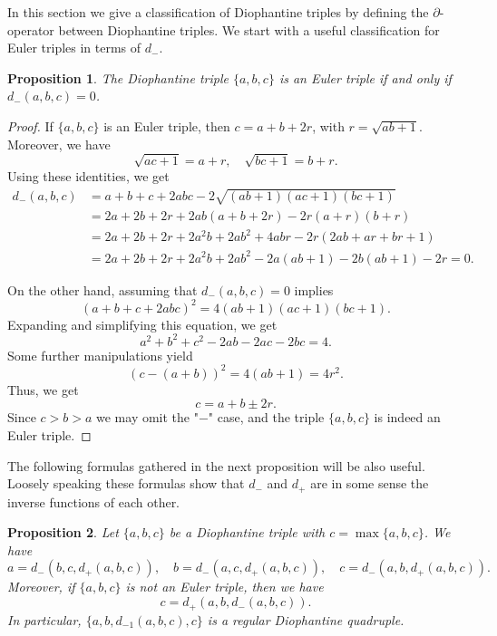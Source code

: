 \documentclass{amsart}
\newtheorem{proposition}{Proposition}
\theoremstyle{definition}
\begin{document}
In this section we give a classification of Diophantine triples by defining the $\partial$-operator between Diophantine triples.
We start with a useful classification for Euler triples in terms of $d_{-}$.

\begin{proposition}\label{pro:2-1}
The Diophantine triple $\{a, b, c\}$ is an Euler triple if and only if $d_{-}(a, b, c) = 0$.
\end{proposition}

\begin{proof}
 If $\{a, b, c\}$ is an Euler triple, then  $c=a+b+2r$, with $r=\sqrt{ab+1}$. Moreover, we have 
$$
\sqrt{ac+1}=a+r ,\quad \sqrt{bc+1}= b+r. 
$$
Using these identities, we get
\begin{align*}
d_{-}(a, b, c) &= a+b+c + 2abc -  2\sqrt{(ab+1)(ac+1)(bc+1)}\\
&= 2a+2b+2r + 2ab(a+b+2r) - 2r(a+r)(b+r)\\
&= 2a+2b+2r + 2a^2b+2ab^2+4abr - 2r(2ab+ar+br+1)\\
&= 2a+2b+2r + 2a^2b+2ab^2 - 2a(ab+1) - 2b(ab+1)-2r=0.
\end{align*}

On the other hand, assuming that $d_{-}(a,b, c)=0$ implies
$$
(a+b+c + 2abc)^2 = 4(ab+1)(ac+1)(bc+1).
$$
Expanding and simplifying this equation, we get
$$
a^2+b^2+c^2-2ab-2ac-2bc=4.
$$ 
Some further manipulations yield
$$
(c-(a+b))^2 = 4(ab+1) = 4r^2. 
$$
Thus, we get
$$
c=a+b\pm 2r. 
$$
Since $c>b>a$ we may omit the "$-$" case, and the triple $\{a, b, c\}$ is indeed an Euler triple.
\end{proof}

The following formulas gathered in the next proposition will be also useful. Loosely speaking these formulas
show that $d_{-}$ and $d_{+}$ are in some sense the inverse functions of each other.

\begin{proposition}\label{pro:2-2}
Let $\{a, b, c\}$ be a Diophantine triple with $c=\max\{a, b, c\}$. We have 
$$
a=d_{-}(b,c,d_{+}(a,b,c)),\quad b=d_{-}(a,c,d_{+}(a,b,c)),\quad c=d_{-}(a,b,d_{+}(a,b,c)).
$$
Moreover, if $\{a,b,c\}$ is not an Euler triple, then we have
$$
c=d_{+}(a,b,d_{-}(a,b,c)).
$$
In particular, $\{a,b,d_{-1}(a,b,c),c\}$ is a regular Diophantine quadruple.
\end{proposition}
\end{document}
